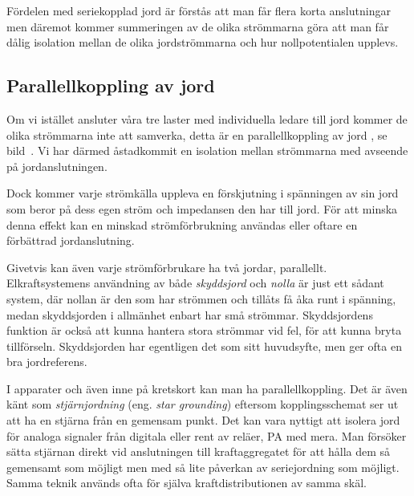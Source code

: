 Fördelen med seriekopplad jord är förstås att man får flera korta anslutningar
men däremot kommer summeringen av de olika strömmarna göra att man får dålig
isolation mellan de olika jordströmmarna och hur nollpotentialen upplevs.

\subsection{Parallellkoppling av jord}

Om vi istället ansluter våra tre laster med individuella ledare till jord
kommer de olika strömmarna inte att samverka, detta är en parallellkoppling
av jord \cite[kap 3]{ott1988}, se bild~.
Vi har därmed åstadkommit en isolation mellan strömmarna med avseende på
jordanslutningen.


Dock kommer varje strömkälla uppleva en förskjutning i spänningen av
sin jord som beror på dess egen ström och impedansen den har till jord.
För att minska denna effekt kan en minskad strömförbrukning användas
eller oftare en förbättrad jordanslutning.

Givetvis kan även varje strömförbrukare ha två jordar, parallellt.
Elkraftsystemens användning av både \emph{skyddsjord} och \emph{nolla} är
just ett sådant system, där nollan är den som har strömmen och tillåts få
åka runt i spänning, medan skyddsjorden i allmänhet enbart har små strömmar.
Skyddsjordens funktion är också att kunna hantera stora strömmar vid fel,
för att kunna bryta tillförseln.
Skyddsjorden har egentligen det som sitt huvudsyfte, men ger ofta en bra
jordreferens.

I apparater och även inne på kretskort kan man ha parallellkoppling.
Det är även känt som \emph{stjärnjordning} (eng. \emph{star grounding})
eftersom kopplingsschemat ser ut att ha en stjärna från en gemensam punkt.
Det kan vara nyttigt att isolera jord för analoga signaler från digitala eller
rent av reläer, PA med mera.
Man försöker sätta stjärnan direkt vid anslutningen till kraftaggregatet för
att hålla dem så gemensamt som möjligt men med så lite påverkan av
seriejordning som möjligt.
Samma teknik används ofta för själva kraftdistributionen av samma skäl.

